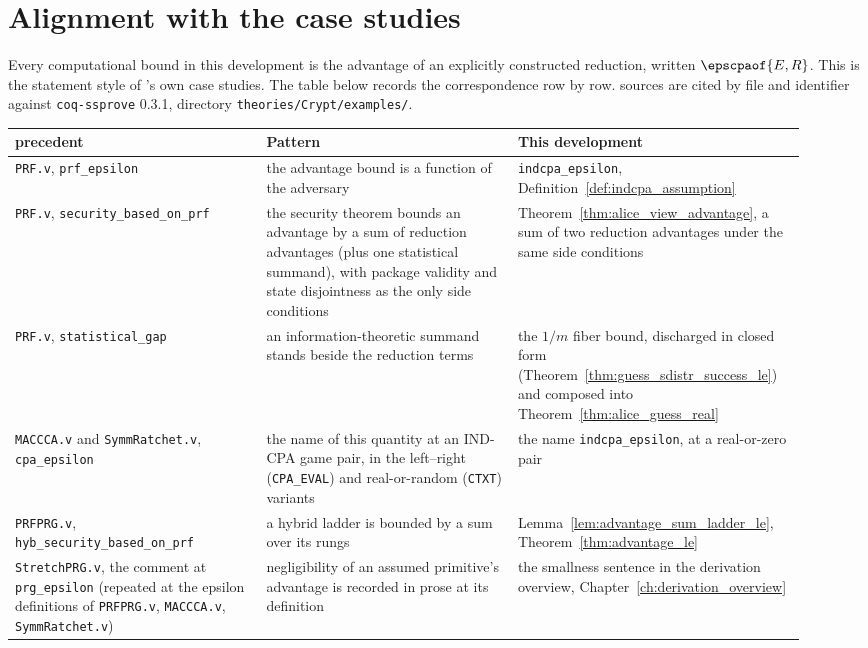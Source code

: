 
\chapter{Alignment with the \ssprove{} case studies}
\label{ch:ssprove_alignment}

Every computational bound in this development is the advantage of an
explicitly constructed reduction, written $\epscpaof{E,R}$. This is the
statement style of \ssprove{}'s own case studies. The table below records
the correspondence row by row. \ssprove{} sources are cited by file and
identifier against \texttt{coq-ssprove} 0.3.1, directory
\texttt{theories/Crypt/examples/}.

\begin{center}
\begin{tabular}{p{0.30\linewidth}p{0.30\linewidth}p{0.32\linewidth}}
\textbf{\ssprove{} precedent} & \textbf{Pattern} & \textbf{This development} \\
\hline
\texttt{PRF.v}, \texttt{prf\_epsilon} &
the advantage bound is a function of the adversary &
\texttt{indcpa\_epsilon}, Definition~\ref{def:indcpa_assumption} \\
\hline
\texttt{PRF.v}, \texttt{security\_based\_on\_prf} &
the security theorem bounds an advantage by a sum of reduction advantages
(plus one statistical summand), with package validity and state
disjointness as the only side conditions &
Theorem~\ref{thm:alice_view_advantage}, a sum of two reduction advantages
under the same side conditions \\
\hline
\texttt{PRF.v}, \texttt{statistical\_gap} &
an information-theoretic summand stands beside the reduction terms &
the $1/m$ fiber bound, discharged in closed form
(Theorem~\ref{thm:guess_sdistr_success_le}) and composed into
Theorem~\ref{thm:alice_guess_real} \\
\hline
\texttt{MACCCA.v} and \texttt{SymmRatchet.v}, \texttt{cpa\_epsilon} &
the name of this quantity at an IND-CPA game pair, in the left--right
(\texttt{CPA\_EVAL}) and real-or-random (\texttt{CTXT}) variants &
the name \texttt{indcpa\_epsilon}, at a real-or-zero pair \\
\hline
\texttt{PRFPRG.v}, \texttt{hyb\_security\_based\_on\_prf} &
a hybrid ladder is bounded by a sum over its rungs &
Lemma~\ref{lem:advantage_sum_ladder_le},
Theorem~\ref{thm:advantage_le} \\
\hline
\texttt{StretchPRG.v}, the comment at \texttt{prg\_epsilon} (repeated at
the epsilon definitions of \texttt{PRFPRG.v}, \texttt{MACCCA.v},
\texttt{SymmRatchet.v}) &
negligibility of an assumed primitive's advantage is recorded in prose at
its definition &
the smallness sentence in the derivation overview,
Chapter~\ref{ch:derivation_overview} \\
\end{tabular}
\end{center}


